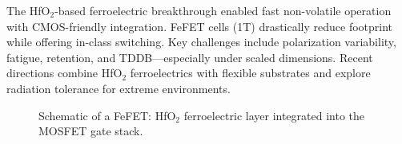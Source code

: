 The HfO$_2$-based ferroelectric breakthrough enabled fast non-volatile operation with CMOS-friendly integration. 
FeFET cells (1T) drastically reduce footprint while offering in-class switching. 
Key challenges include polarization variability, fatigue, retention, and TDDB---especially under scaled dimensions.
Recent directions combine HfO$_2$ ferroelectrics with flexible substrates and explore radiation tolerance for extreme environments.

\begin{figure}[!t]
\centering
{}
\caption{Schematic of a FeFET: HfO$_2$ ferroelectric layer integrated into the MOSFET gate stack.}
\label{fig:feram_fefet}
\end{figure}
